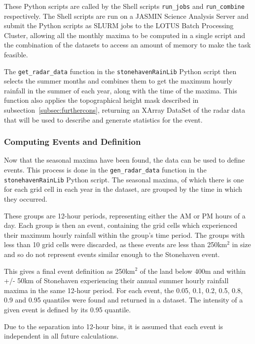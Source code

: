 These Python scripts are called by the Shell scripts \texttt{run\_jobs} and \texttt{run\_combine} respectively.
The Shell scripts are run on a JASMIN Science Analysis Server and submit the Python scripts as SLURM jobs to the LOTUS Batch Processing Cluster,
    allowing all the monthly maxima to be computed in a single script and the combination of the datasets to access an amount of memory to make the task feasible.

The \texttt{get\_radar\_data} function in the \texttt{stonehavenRainLib} Python script then selects the summer months and
    combines them to get the maximum hourly rainfall in the summer of each year,
    along with the time of the maxima.
This function also applies the topographical height mask described in subsection~\ref{subsec:furthercons},
    returning an XArray DataSet of the radar data that will be used to describe and generate statistics for the event.

\subsubsection{Computing Events and Definition}

Now that the seasonal maxima have been found,
    the data can be used to define events.
This process is done in the \texttt{gen\_radar\_data} function in the \texttt{stonehavenRainLib} Python script.
The seasonal maxima,
    of which there is one for each grid cell in each year in the dataset,
    are grouped by the time in which they occurred.

These groups are 12-hour periods,
    representing either the AM or PM hours of a day.
Each group is then an event,
    containing the grid cells which experienced their maximum hourly rainfall within the group's time period.
The groups with less than 10 grid cells were discarded,
    as these events are less than 250km$^2$ in size and
    so do not represent events similar enough to the Stonehaven event.

This gives a final event definition as 250km$^2$ of the land below 400m and within +/- 50km of Stonehaven
    experiencing their annual summer hourly rainfall maxima in the same 12-hour period.
For each event, the 0.05, 0.1, 0.2, 0.5, 0.8, 0.9 and 0.95 quantiles were found and returned in a dataset.
The intensity of a given event is defined by its 0.95 quantile.

Due to the separation into 12-hour bins,
    it is assumed that each event is independent in all future calculations.


